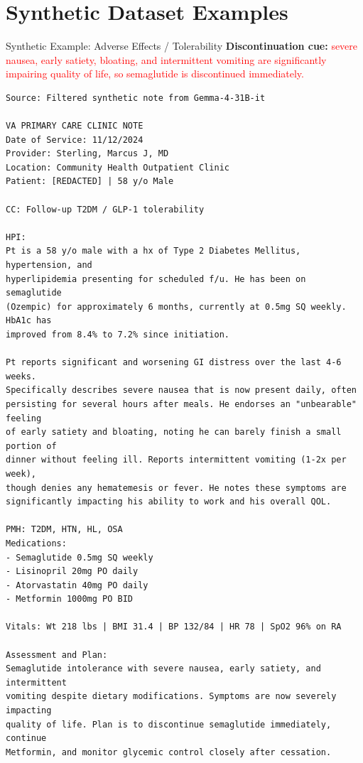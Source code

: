 \documentclass[aspectratio=169]{beamer}
\begin{document}
\section{Synthetic Dataset Examples}

\begin{frame}{Synthetic Example: Adverse Effects / Tolerability}
\tiny
\textbf{Discontinuation cue:}
\textcolor{red}{severe nausea, early satiety, bloating, and intermittent vomiting are significantly impairing quality of life, so semaglutide is discontinued immediately.}

\vspace{0.5em}
\begin{verbatim}
Source: Filtered synthetic note from Gemma-4-31B-it

VA PRIMARY CARE CLINIC NOTE
Date of Service: 11/12/2024
Provider: Sterling, Marcus J, MD
Location: Community Health Outpatient Clinic
Patient: [REDACTED] | 58 y/o Male

CC: Follow-up T2DM / GLP-1 tolerability

HPI:
Pt is a 58 y/o male with a hx of Type 2 Diabetes Mellitus, hypertension, and
hyperlipidemia presenting for scheduled f/u. He has been on semaglutide
(Ozempic) for approximately 6 months, currently at 0.5mg SQ weekly. HbA1c has
improved from 8.4% to 7.2% since initiation.

Pt reports significant and worsening GI distress over the last 4-6 weeks.
Specifically describes severe nausea that is now present daily, often
persisting for several hours after meals. He endorses an "unbearable" feeling
of early satiety and bloating, noting he can barely finish a small portion of
dinner without feeling ill. Reports intermittent vomiting (1-2x per week),
though denies any hematemesis or fever. He notes these symptoms are
significantly impacting his ability to work and his overall QOL.

PMH: T2DM, HTN, HL, OSA
Medications:
- Semaglutide 0.5mg SQ weekly
- Lisinopril 20mg PO daily
- Atorvastatin 40mg PO daily
- Metformin 1000mg PO BID

Vitals: Wt 218 lbs | BMI 31.4 | BP 132/84 | HR 78 | SpO2 96% on RA

Assessment and Plan:
Semaglutide intolerance with severe nausea, early satiety, and intermittent
vomiting despite dietary modifications. Symptoms are now severely impacting
quality of life. Plan is to discontinue semaglutide immediately, continue
Metformin, and monitor glycemic control closely after cessation.
\end{verbatim}
\end{frame}
\end{document}
